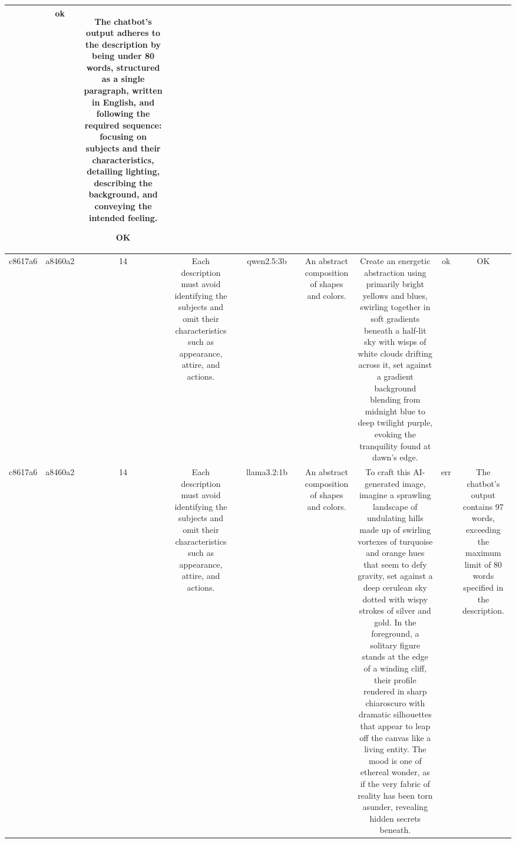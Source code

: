 \begin{table}[h!]
\begin{tabular}{|c|c|c|c|c|c|c|c|c|c|c|}
 & ok & The chatbot's output adheres to the description by being under 80 words, structured as a single paragraph, written in English, and following the required sequence: focusing on subjects and their characteristics, detailing lighting, describing the background, and conveying the intended feeling.

OK\\
\hline
c8617a6 & a8460a2 & 14 & Each description must avoid identifying the subjects and omit their characteristics such as appearance, attire, and actions. &  & qwen2.5:3b &  & An abstract composition of shapes and colors. & Create an energetic abstraction using primarily bright yellows and blues, swirling together in soft gradients beneath a half-lit sky with wisps of white clouds drifting across it, set against a gradient background blending from midnight blue to deep twilight purple, evoking the tranquility found at dawn's edge. & ok & OK\\
\hline
c8617a6 & a8460a2 & 14 & Each description must avoid identifying the subjects and omit their characteristics such as appearance, attire, and actions. &  & llama3.2:1b &  & An abstract composition of shapes and colors. & To craft this AI-generated image, imagine a sprawling landscape of undulating hills made up of swirling vortexes of turquoise and orange hues that seem to defy gravity, set against a deep cerulean sky dotted with wispy strokes of silver and gold. In the foreground, a solitary figure stands at the edge of a winding cliff, their profile rendered in sharp chiaroscuro with dramatic silhouettes that appear to leap off the canvas like a living entity. The mood is one of ethereal wonder, as if the very fabric of reality has been torn asunder, revealing hidden secrets beneath. & err & The chatbot's output contains 97 words, exceeding the maximum limit of 80 words specified in the description.


\end{tabular}
\end{table}
